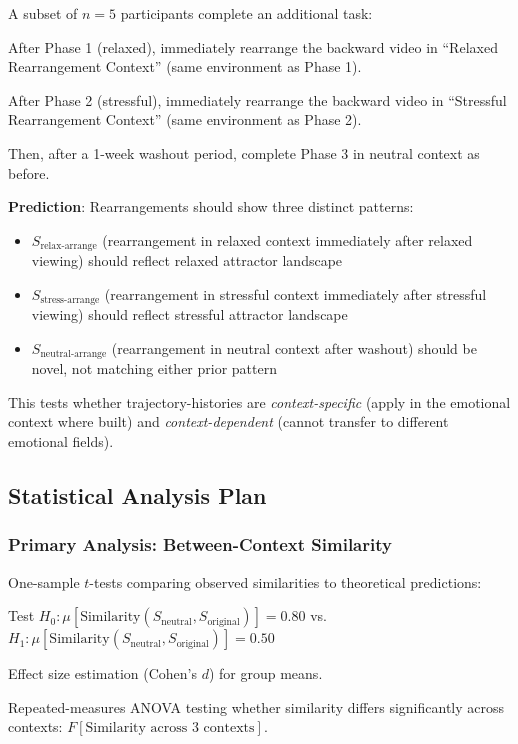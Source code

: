 \documentclass[12pt,a4paper]{article}
\theoremstyle{definition}
\begin{document}
A subset of $n = 5$ participants complete an additional task:

After Phase 1 (relaxed), immediately rearrange the backward video in ``Relaxed Rearrangement Context'' (same environment as Phase 1).

After Phase 2 (stressful), immediately rearrange the backward video in ``Stressful Rearrangement Context'' (same environment as Phase 2).

Then, after a 1-week washout period, complete Phase 3 in neutral context as before.

\textbf{Prediction}: Rearrangements should show three distinct patterns:
\begin{itemize}
  \item $S_{\text{relax-arrange}}$ (rearrangement in relaxed context immediately after relaxed viewing) should reflect relaxed attractor landscape
  \item $S_{\text{stress-arrange}}$ (rearrangement in stressful context immediately after stressful viewing) should reflect stressful attractor landscape
  \item $S_{\text{neutral-arrange}}$ (rearrangement in neutral context after washout) should be novel, not matching either prior pattern
\end{itemize}

This tests whether trajectory-histories are \textit{context-specific} (apply in the emotional context where built) and \textit{context-dependent} (cannot transfer to different emotional fields).

\subsection{Statistical Analysis Plan}

\subsubsection{Primary Analysis: Between-Context Similarity}

One-sample $t$-tests comparing observed similarities to theoretical predictions:

Test $H_0: \mu[\text{Similarity}(S_{\text{neutral}}, S_{\text{original}})] = 0.80$ vs. $H_1: \mu[\text{Similarity}(S_{\text{neutral}}, S_{\text{original}})] = 0.50$

Effect size estimation (Cohen's $d$) for group means.

Repeated-measures ANOVA testing whether similarity differs significantly across contexts: $F[\text{Similarity across 3 contexts}]$.
\end{document}
